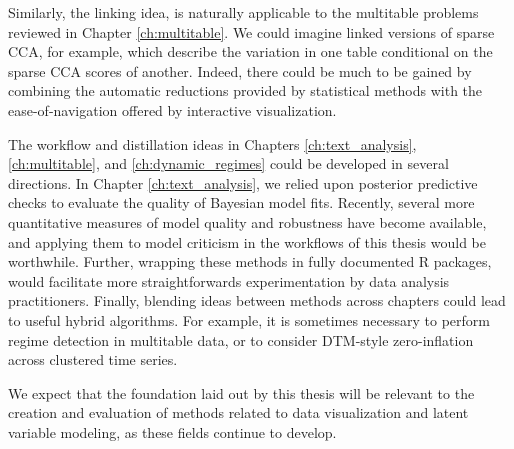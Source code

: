 Similarly, the linking idea, is naturally applicable to the multitable problems
reviewed in Chapter \ref{ch:multitable}. We could imagine linked versions of
sparse CCA, for example, which describe the variation in one table conditional
on the sparse CCA scores of another. Indeed, there could be much to be gained by
combining the automatic reductions provided by statistical methods with the
ease-of-navigation offered by interactive visualization.

The workflow and distillation ideas in Chapters \ref{ch:text_analysis},
\ref{ch:multitable}, and \ref{ch:dynamic_regimes} could be developed in several
directions. In Chapter \ref{ch:text_analysis}, we relied upon posterior
predictive checks to evaluate the quality of Bayesian model fits. Recently,
several more quantitative measures of model quality \citep{gorham2015measuring,
  liu2016kernelized} and robustness \citep{giordano2016fast} have become
available, and applying them to model criticism in the workflows of this thesis
would be worthwhile. Further, wrapping these methods in fully documented R
packages, would facilitate more straightforwards experimentation by data
analysis practitioners. Finally, blending ideas between methods across chapters
could lead to useful hybrid algorithms. For example, it is sometimes necessary
to perform regime detection in multitable data, or to consider DTM-style
zero-inflation across clustered time series.

We expect that the foundation laid out by this thesis will be relevant to the
creation and evaluation of methods related to data visualization and latent
variable modeling, as these fields continue to develop.
